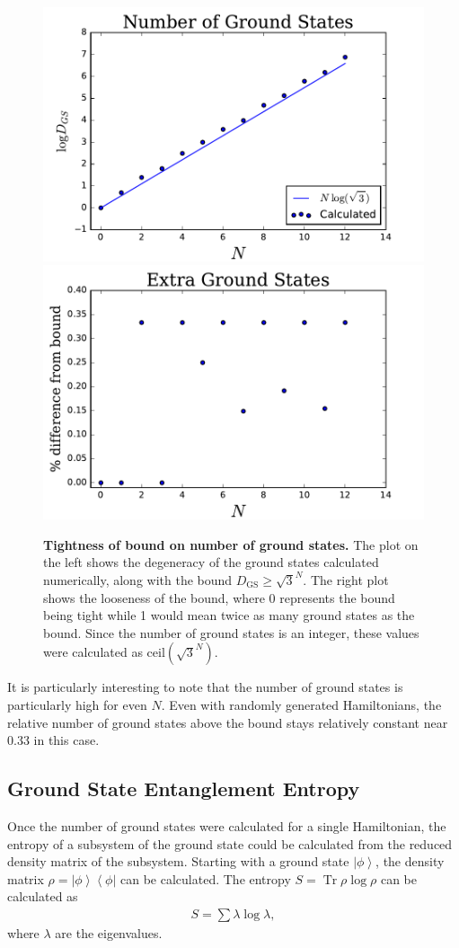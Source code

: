 \documentclass[12pt]{article} %
\newcommand{\ket}[1]{\left|#1\right\rangle}
\newcommand{\bra}[1]{\left\langle#1\right|}
\DeclareMathOperator{\Tr}{Tr}
\begin{document}
\begin{figure}
	\centering
	\includegraphics[width=.49\textwidth]{gscount}
	\includegraphics[width=.49\textwidth]{gserr}
	\caption{\textbf{Tightness of bound on number of ground states.} The plot on the left shows the degeneracy of the ground states calculated numerically, along with the bound $D_\text{GS} \ge \sqrt{3}^N$. The right plot shows the looseness of the bound, where 0 represents the bound being tight while 1 would mean twice as many ground states as the bound. Since the number of ground states is an integer, these values were calculated as $\text{ceil}(\sqrt{3}^N)$.}
	\label{fig:gserr}
\end{figure}

It is particularly interesting to note that the number of ground states is particularly high for even $N$. Even with randomly generated Hamiltonians, the relative number of ground states above the bound stays relatively constant near 0.33 in this case.

\subsection{Ground State Entanglement Entropy}\emph{} \label{sub:num_ent}

Once the number of ground states were calculated for a single Hamiltonian, the entropy of a subsystem of the ground state could be calculated from the reduced density matrix of the subsystem. Starting with a ground state $\ket{\phi}$, the density matrix $\rho = \ket{\phi}\bra{\phi}$ can be calculated. The entropy $S = \Tr\rho\log\rho$ can be calculated as 
\begin{align}
S = \sum \lambda\log\lambda,
\end{align}
where $\lambda$ are the eigenvalues. 
\end{document}

